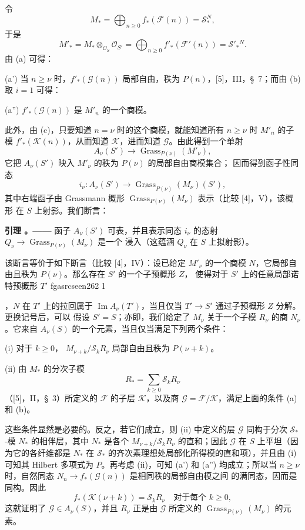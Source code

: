 \documentclass[12pt,twoside,openany]{book}
\numberwithin{equation}{section}
\newcommand{\fgaunitid}{unbound}
\newcommand{\src}[1]{%
  \phantomsection
  \hypertarget{src:\fgaunitid:#1}{}%
  \hypertarget{fga.\fgaunitid.p#1}{}%
  \ifcsname fgasrcseen#1\endcsname\else
    \expandafter\gdef\csname fgasrcseen#1\endcsname{1}%
    \hypertarget{src:#1}{}%
  \fi
  \marginpar{\raggedleft\footnotesize\sffamily #1}%
}
\theoremstyle{plain}
\theoremstyle{definition}
\theoremstyle{remark}
\newcommand{\result}[2]{%
  \par\medskip\noindent\textbf{#1%
  \if\relax\detokenize{#2}\relax\else\space#2\fi。——}\enspace
}
\begin{document}
令
\[
M_* =\bigoplus_{n\geq0}f_*(\mathcal F(n))=\mathcal S_*^{N},
\]
于是
\[
M'_* =M_*\otimes_{\mathcal O_S}\mathcal O_{S'}
=\bigoplus_{n\geq0}f'_*(\mathcal F'(n))=\mathcal S'_*{}^{N}.
\]
由 (a) 可得：

\noindent (a') 当 $n\geq\nu$ 时，$f'_*(\mathcal G(n))$ 局部自由，秩为
$P(n)$，[5]，III，\S~7；而由 (b) 取 $i=1$ 可得：

\noindent (a'') $f'_*(\mathcal G(n))$ 是 $M'_n$ 的一个商模。

此外，由 (c)，只要知道 $n=\nu$ 时的这个商模，就能知道所有
$n\geq\nu$ 时 $M'_n$ 的子模 $f'_*(\mathcal K(n))$，从而知道
$\mathcal K$，进而知道 $\mathcal G$。由此得到一个单射
\[
A_\nu(S')\longrightarrow\operatorname{Grass}_{P(\nu)}(M'_\nu),
\]
它把 $A_\nu(S')$ 映入 $M'_\nu$ 的秩为 $P(\nu)$ 的局部自由商模集合；
因而得到函子性同态
\[
i_\nu:A_\nu(S')\longrightarrow
\underline{\operatorname{Grass}}_{P(\nu)}(M_\nu)(S'),
\]
其中右端函子由 Grassmann 概形
$\operatorname{Grass}_{P(\nu)}(M_\nu)$ 表示（比较 [4]，V），该概形
在 $S$ 上射影。我们断言：

\result{引理}{3.3} 函子 $A_\nu(S')$ 可表，并且表示同态 $i_\nu$ 的态射
$Q_\nu\longrightarrow\operatorname{Grass}_{P(\nu)}(M_\nu)$ 是一个
浸入（这蕴涵 $Q_\nu$ 在 $S$ 上拟射影）。

该断言等价于如下断言（比较 [4]，IV）：设已给定 $M'_\nu$ 的一个商模
$N$，它局部自由且秩为 $P(\nu)$。那么存在 $S'$ 的一个子预概形 $Z$，
使得对于 $S'$ 上的任意局部诺特预概形 $T'$
\src{262}
，$N$ 在 $T'$ 上的拉回属于 $\operatorname{Im}A_\nu(T')$，当且仅当
$T'\longrightarrow S'$ 通过子预概形 $Z$ 分解。更换记号后，可以
假设 $S'=S$；亦即，我们给定了 $M_\nu$ 关于一个子模 $R_\nu$ 的商
$N_\nu$。它来自 $A_\nu(S)$ 的一个元素，当且仅当满足下列两个条件：

\medskip
\noindent (i) 对于 $k\geq0$，
$M_{\nu+k}/\mathcal S_kR_\nu$ 局部自由且秩为 $P(\nu+k)$。

\smallskip
\noindent (ii) 由 $M_*$ 的分次子模
\[
R_* =\sum_{k\geq0}\mathcal S_kR_\nu
\]
（[5]，II，\S~3）所定义的 $\mathcal F$ 的子层 $\mathcal K$，以及商
$\mathcal G=\mathcal F/\mathcal K$，满足上面的条件 (a) 和 (b)。

这些条件显然是必要的。反之，若它们成立，则 (ii) 中定义的层
$\mathcal G$ 同构于分次 $\mathcal S_*$-模 $N_*$ 的相伴层，其中
$N_*$ 是各个 $M_{\nu+k}/\mathcal S_kR_\nu$ 的直和；因此
$\mathcal G$ 在 $S$ 上平坦（因为它的各纤维都是 $N_*$ 在
$\mathcal S_*$ 的齐次素理想处局部化所得模的直和项），并且由 (i)
可知其 Hilbert 多项式为 $P$。再考虑 (ii)，可知 (a') 和 (a'')
均成立；所以当 $n\geq\nu$ 时，自然同态
$N_n\longrightarrow f_*(\mathcal G(n))$ 是相同秩的局部自由模之间
的满同态，因而是同构。因此
\[
f_*(\mathcal K(\nu+k))=\mathcal S_kR_\nu
\quad\text{对于每个 $k\geq0$},
\]
这就证明了 $\mathcal G\in A_\nu(S)$，并且 $R_\nu$ 正是由
$\mathcal G$ 所定义的
$\operatorname{Grass}_{P(\nu)}(M_\nu)$ 的元素。
\end{document}

